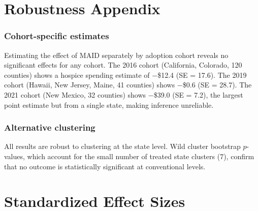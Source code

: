 \documentclass[12pt]{article}
\begin{document}
\section{Robustness Appendix}

\subsubsection*{Cohort-specific estimates}
Estimating the effect of MAID separately by adoption cohort reveals no significant effects for any cohort. The 2016 cohort (California, Colorado, 120 counties) shows a hospice spending estimate of $-$\$12.4 (SE = 17.6). The 2019 cohort (Hawaii, New Jersey, Maine, 41 counties) shows $-$\$0.6 (SE = 28.7). The 2021 cohort (New Mexico, 32 counties) shows $-$\$39.0 (SE = 7.2), the largest point estimate but from a single state, making inference unreliable.

\subsubsection*{Alternative clustering}
All results are robust to clustering at the state level. Wild cluster bootstrap $p$-values, which account for the small number of treated state clusters (7), confirm that no outcome is statistically significant at conventional levels.

\section{Standardized Effect Sizes}
\label{sec:sde}


\end{document}
